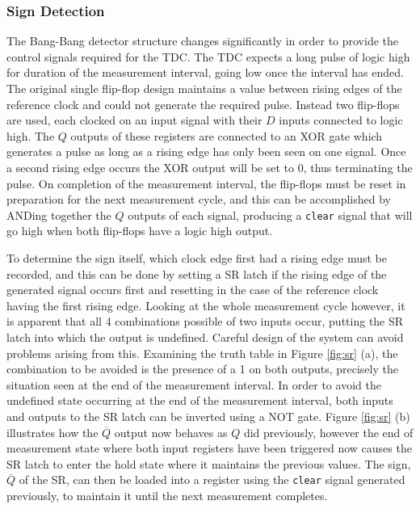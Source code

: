 \subsubsection{Sign Detection}
The Bang-Bang detector structure changes significantly in order to provide the control signals required for the \ac{TDC}. The \ac{TDC} expects a long pulse of logic high for duration of the measurement interval, going low once the interval has ended. The original single flip-flop design maintains a value between rising edges of the reference clock and could not generate the required pulse. Instead two flip-flops are used, each clocked on an input signal with their $D$ inputs connected to logic high. The $Q$ outputs of these registers are connected to an \acs{XOR} gate which generates a pulse as long as a rising edge has only been seen on one signal. Once a second rising edge occurs the \acs{XOR} output will be set to 0, thus terminating the pulse. On completion of the measurement interval, the flip-flops must be reset in preparation for the next measurement cycle, and this can be accomplished by ANDing together the $Q$ outputs of each signal, producing a \texttt{clear} signal that will go high when both flip-flops have a logic high output.

To determine the sign itself, which clock edge first had a rising edge must be recorded, and this can be done by setting a \ac{SR} latch if the rising edge of the generated signal occurs first and resetting in the case of the reference clock having the first rising edge. Looking at the whole measurement cycle however, it is apparent that all 4 combinations possible of two inputs occur, putting the \ac{SR} latch into which the output is undefined. Careful design of the system can avoid problems arising from this. Examining the truth table in Figure \ref{fig:sr} (a), the combination to be avoided is the presence of a 1 on both outputs, precisely the situation seen at the end of the measurement interval. In order to avoid the undefined state occurring at the end of the measurement interval, both inputs and outputs to the \ac{SR} latch can be inverted using a NOT gate. Figure \ref{fig:sr} (b) illustrates how the $\overline{Q}$ output now behaves as $Q$ did previously, however the end of measurement state where both input registers have been triggered now causes the \ac{SR} latch to enter the hold state where it maintains the previous values. The sign, $\overline{Q}$ of the \ac{SR}, can then be loaded into a register using the \texttt{clear} signal generated previously, to maintain it until the next measurement completes.

